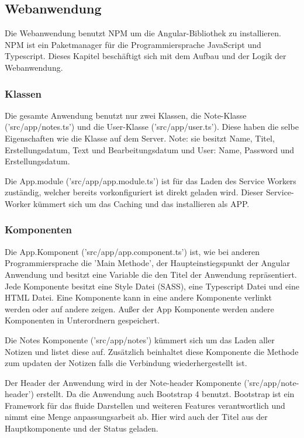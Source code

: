 \documentclass[12pt]{article}
\begin{document}
        \subsection{Webanwendung}

Die Webanwendung benutzt NPM um die Angular-Bibliothek zu installieren. NPM ist ein Paketmanager für die Programmiersprache JavaScript und Typescript. Dieses Kapitel beschäftigt sich mit dem Aufbau und der Logik der Webanwendung.

            \subsubsection{Klassen}

Die gesamte Anwendung benutzt nur zwei Klassen, die Note-Klasse ('src/app/notes.ts') und die User-Klasse ('src/app/user.ts'). Diese haben die selbe Eigenschaften wie die Klasse auf dem Server. Note: sie besitzt Name, Titel, Erstellungsdatum, Text und Bearbeitungsdatum und User: Name, Password und Erstellungsdatum.

Die App.module ('src/app/app.module.ts') ist für das Laden des Service Workers zuständig, welcher bereits vorkonfiguriert ist direkt geladen wird. Dieser Service-Worker kümmert sich um das Caching und das installieren als APP. 
            
            \subsubsection{Komponenten}

Die App.Komponent ('src/app/app.component.ts') ist, wie bei anderen Programmiersprache die 'Main Methode', der Haupteinstiegspunkt der Angular Anwendung und besitzt eine Variable die den Titel der Anwendung repräsentiert. Jede Komponente besitzt eine Style Datei (SASS), eine Typescript Datei und eine HTML Datei. Eine Komponente kann in eine andere Komponente verlinkt werden oder auf andere zeigen. Außer der App Komponente werden andere Komponenten in Unterordnern gespeichert. 

Die Notes Komponente ('src/app/notes') kümmert sich um das Laden aller Notizen und listet diese auf. Zusätzlich beinhaltet diese Komponente die Methode zum updaten der Notizen falls die Verbindung wiederhergestellt ist. 

Der Header der Anwendung wird in der Note-header Komponente ('src/app/note-header') erstellt. Da die Anwendung auch Bootstrap 4 benutzt. Bootstrap ist ein Framework für das fluide Darstellen und weiteren Features verantwortlich und nimmt eine Menge anpassungsarbeit ab. Hier wird auch der Titel aus der Hauptkomponente und der Status geladen.
\end{document}
